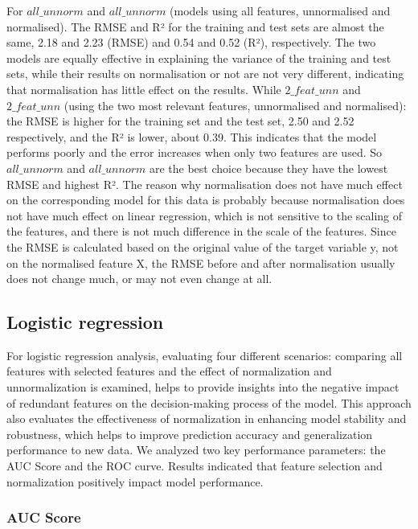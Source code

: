 \documentclass[conference]{IEEEtran}
\begin{document}
For $all\_unnorm$ and $all\_unnorm$ (models using all features, unnormalised and normalised). The RMSE and R² for the training and test sets are almost the same, 2.18 and 2.23 (RMSE) and 0.54 and 0.52 (R²), respectively. The two models are equally effective in explaining the variance of the training and test sets, while their results on normalisation or not are not very different, indicating that normalisation has little effect on the results.
While $2\_feat\_unn$ and $2\_feat\_unn$ (using the two most relevant features, unnormalised and normalised): the RMSE is higher for the training set and the test set, 2.50 and 2.52 respectively, and the R² is lower, about 0.39. This indicates that the model performs poorly and the error increases when only two features are used.
So $all\_unnorm$ and $all\_unnorm$ are the best choice because they have the lowest RMSE and highest R².
The reason why normalisation does not have much effect on the corresponding model for this data is probably because normalisation does not have much effect on linear regression, which is not sensitive to the scaling of the features, and there is not much difference in the scale of the features. Since the RMSE is calculated based on the original value of the target variable y, not on the normalised feature X, the RMSE before and after normalisation usually does not change much, or may not even change at all.

\subsection{Logistic regression}

For logistic regression analysis, evaluating four different scenarios: comparing all features with selected features and the effect of normalization and unnormalization is examined, helps to provide insights into the negative impact of redundant features on the decision-making process of the model. This approach also evaluates the effectiveness of normalization in enhancing model stability and robustness, which helps to improve prediction accuracy and generalization performance to new data. We analyzed two key performance parameters: the AUC Score and the ROC curve. Results indicated that feature selection and normalization positively impact model performance.

\subsubsection{AUC Score}
\end{document}
